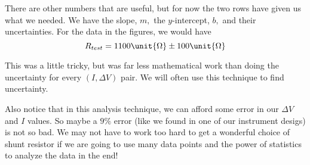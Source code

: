 There are other numbers that are useful, but for now the two rows have given
us what we needed. We have the slope, $m,$ the $y$-intercept, $b,$ and their
uncertainties. For the data in the figures, we would have 
\begin{equation*}
	R_{test}=1100\unit{%
		\Omega%
	}\pm 100\unit{%
		\Omega%
	}
\end{equation*}

This was a little tricky, but was far less mathematical work than doing the
uncertainty for every $\left( I,\Delta V\right) $ pair. We will often use
this technique to find uncertainty.

Also notice that in this analysis technique, we can afford some error in our 
$\Delta V$ and $I$ values. So maybe a $9\%$ error (like we found in one of
our instrument desigs) is not so bad. We may not have to work too hard to
get a wonderful choice of shunt resistor if we are going to use many data
points and the power of statistics to analyze the data in the end!
